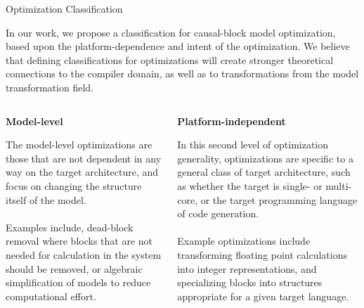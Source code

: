 \documentclass[final,hyperref={pdfpagelabels=false}]{beamer}
\begin{document}
\begin{frame}{}
    \begin{block}{Optimization Classification}
    \begin{center}
    \small
    In our work, we propose a classification for causal-block model optimization, based upon the platform-dependence and intent of the optimization. We believe that defining classifications for optimizations will create
    stronger theoretical connections to the compiler domain, as well as to transformations from the model
    transformation field.
    \end{center}
    \vspace{-1.5cm}
            \begin{columns}[t]
             \begin{column}{.19\linewidth}
             \small
           \begin{center}\textbf{Model-level}\end{center}
           \footnotesize
           The model-level optimizations are those that are not dependent in any way on the target architecture, and focus on changing the structure itself of the model. \\~\\Examples include, dead-block removal where
           blocks that are not needed for calculation in the system should be removed, or algebraic simplification of models to reduce computational effort.
           \end{column}
           \hspace{-1.2cm}\vrule\hspace{.05cm}
           \begin{column}{.19\linewidth}
           \small
          \begin{center}\textbf{Platform-independent}\end{center}
          \footnotesize
            In this second level of optimization generality, optimizations are specific to a general class
            of target architecture, such as whether the target is single- or multi- core, or the
            target programming language of code generation. \\~\\Example optimizations include transforming
            floating point calculations into integer representations, and specializing blocks into structures appropriate for a given
            target language.
            \end{column}
            \hspace{-1.2cm}\vrule\hspace{.05cm}

\end{columns}
\end{block}
\end{frame}
\end{document}

